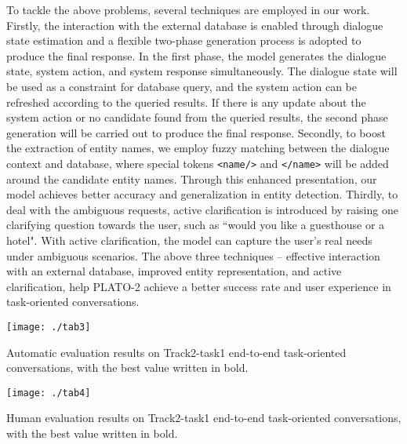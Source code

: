 \documentclass[letterpaper]{article} \usepackage{aaai21}  \usepackage{times}  \usepackage{helvet} \usepackage{courier}  \usepackage[hyphens]{url}  \usepackage{graphicx} \urlstyle{rm} \def\UrlFont{\rm}  \usepackage{natbib}  \usepackage{caption} \frenchspacing  \setlength{\pdfpagewidth}{8.5in}  \setlength{\pdfpageheight}{11in}  \usepackage{amsmath}
\begin{document}
To tackle the above problems, several techniques are employed in our work. Firstly, the interaction with the external database is enabled through dialogue state estimation \cite{ham2020end} and a flexible two-phase generation process is adopted to produce the final response. In the first phase, the model generates the dialogue state, system action, and system response simultaneously. The dialogue state will be used as a constraint for database query, and the system action can be refreshed according to the queried results. If there is any update about the system action or no candidate found from the queried results, the second phase generation will be carried out to produce the final response. Secondly, to boost the extraction of entity names, we employ fuzzy matching between the dialogue context and database, where special tokens \texttt{<name/>} and \texttt{</name>} will be added around the candidate entity names. Through this enhanced presentation, our model achieves better accuracy and generalization in entity detection. Thirdly, to deal with the ambiguous requests, active clarification is introduced by raising one clarifying question towards the user, such as ``would you like a guesthouse or a hotel". With active clarification, the model can capture the user's real needs under ambiguous scenarios. The above three techniques -- effective interaction with an external database, improved entity representation, and active clarification, help PLATO-2 achieve a better success rate and user experience in task-oriented conversations. 

\begin{table*}
	\centering
	\texttt{[image: ./tab3]}
	\caption{Automatic evaluation results on Track2-task1 end-to-end task-oriented conversations, with the best value written in bold.}
	\label{tab:task_auto}
\end{table*} 
\begin{table*}
	\centering
	\texttt{[image: ./tab4]}
	\caption{Human evaluation results on Track2-task1 end-to-end task-oriented conversations, with the best value written in bold.}
	\label{tab:task_human}
\end{table*} 
\end{document}
